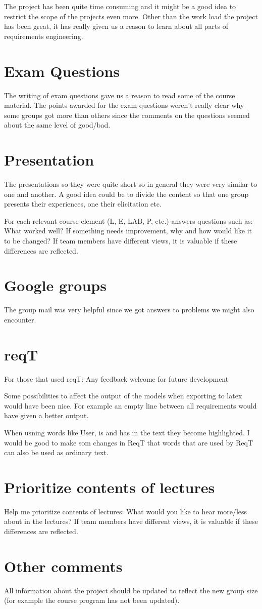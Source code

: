 \documentclass[a4paper]{article}
\begin{document}
	The project has been quite time consuming and it might be a good idea to restrict the scope of the projects even more. Other than the work load the project has been great, it has really given us a reason to learn about all parts of requirements engineering.

	\section{Exam Questions}
	The writing of exam questions gave us a reason to read some of the course material. The points awarded for the exam questions weren't really clear why some groups got more than others since the comments on the questions seemed about the same level of good/bad.	
	
	\section{Presentation}
The presentations so they were quite short so in general they were very similar to	one and another. A good idea could be to divide the content so that one group presents their experiences, one their elicitation etc.
	
	
	For each relevant course element (L, E, LAB, P, etc.) answers questions such as:
What worked well? If something needs improvement, why and how would like
it to be changed?
If team members have different views, it is valuable if these differences are
reflected.

	\section{Google groups}
	The group mail was very helpful since we got answers to problems we might also encounter.

	\section{reqT}
	For those that used reqT: Any feedback welcome for future development
	
	Some possibilities to affect the output of the models when exporting to latex would have been nice. For example an empty line between all requirements would have given a better output.

	When usning words like User, is and has in the text they become highlighted. I would be good to make som changes in ReqT that words that are used by ReqT can also be used as ordinary text.

	\section{Prioritize contents of lectures}
	Help me prioritize contents of lectures:
What would you like to hear more/less about in the lectures?
If team members have different views, it is valuable if these differences are
reflected.

	\section{Other comments}
	All information about the project should be updated to reflect the new group size (for example the course program has not been updated).
\end{document}
